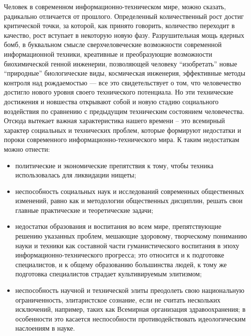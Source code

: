 Человек в современном информационно-техническом мире, можно сказать, радикально отличается от прошлого. Определенный количественный рост достиг критической точки, за которой, как принято говорить, количество переходит в качество, рост вступает в некоторую новую фазу. Разрушительная мощь ядерных бомб, в буквальном смысле сверхчеловеческие возможности современной информационной техники, креативные и преобразующие возможности биохимической генной инженерии, позволяющей человеку ``изобретать'' новые ``природные'' биологические виды, космическая инженерия, эффективные методы контроля над рождаемостью — все это свидетельствует о том, что человечество достигло нового уровня своего технического потенциала. Но эти технические достижения и новшества открывают собой и новую стадию социального воздействия по сравнению с предыдущим техническим состоянием человечества. Отсюда вытекает важная характеристика нашего времени -- это всемирный характер социальных и технических проблем, которые формируют недостатки и пороки современного информационно-технического мира. К таким недостаткам можно отнести:

\begin{itemize}

\item{политические и экономические препятствия к тому, чтобы техника использовалась для ликвидации нищеты;}
  
\item{неспособность социальных наук и исследований современных общественных изменений, равно как и методологии общественных дисциплин, решать свои главные практические и теоретические задачи;}
  
\item{недостатки образования и воспитания во всем мире, препятствующие решению указанных проблем, мешающие здоровому, творческому пониманию науки и техники как составной части гуманистического воспитания в эпоху ин\-фор\-ма\-цион\-но-тех\-ни\-чес\-ко\-го прогресса; это относится и к подготовке специалистов, и к общему образованию большинства людей, к тому же подготовка специалистов страдает культивируемым элитизмом;}
  
\item{неспособность научной и технической элиты преодолеть свою национальную ограниченность, элитаристское сознание, если не считать нескольких исключений, например, таких как Всемирная организация здравоохранения; в особенности это касается неспособности противодействовать идеологическим наслоениям в науке.}
\end{itemize}

